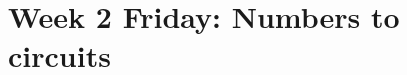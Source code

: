 \newpage
\section*{Week 2 Friday: Numbers to circuits}


\newpage

\vfill
\vfill



\vfill

\vfill
\newpage

